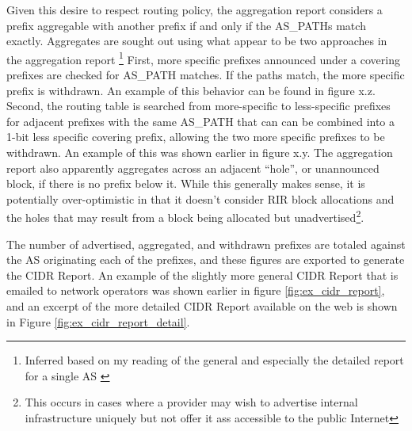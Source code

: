 Given this desire to respect routing policy, the aggregation report considers a prefix aggregable with another prefix if and only if the AS\_PATHs match exactly. Aggregates are sought out using what appear to be two approaches in the aggregation report \footnote{Inferred based on my reading of the general and especially the detailed report for a single AS \cite{cidr-report-details}} First, more specific prefixes announced under a covering prefixes are checked for AS\_PATH matches. If the paths match, the more specific prefix is withdrawn. An example of this behavior can be found in figure x.z. Second, the routing table is searched from more-specific to less-specific prefixes for adjacent prefixes with the same AS\_PATH that can can be combined into a 1-bit less specific covering prefix, allowing the two more specific prefixes to be withdrawn. An example of this was shown earlier in figure x.y. The aggregation report also apparently aggregates across an adjacent ``hole'', or unannounced block, if there is no prefix below it. While this generally makes sense, it is potentially over-optimistic in that it doesn't consider RIR block allocations and the holes that may result from a block being allocated but unadvertised\footnote{This occurs in cases where a provider may wish to advertise internal infrastructure uniquely but not offer it ass accessible to the public Internet}.

The number of advertised, aggregated, and withdrawn prefixes are totaled against the AS originating each of the prefixes, and these figures are exported to generate the CIDR Report. An example of the slightly more general CIDR Report that is emailed to network operators was shown earlier in figure \ref{fig:ex_cidr_report}, and an excerpt of the more detailed CIDR Report available on the web is shown in Figure \ref{fig:ex_cidr_report_detail}.

